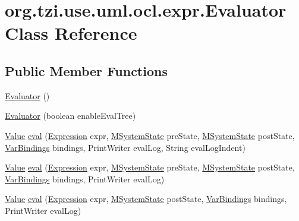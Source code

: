 \hypertarget{classorg_1_1tzi_1_1use_1_1uml_1_1ocl_1_1expr_1_1_evaluator}{\section{org.\-tzi.\-use.\-uml.\-ocl.\-expr.\-Evaluator Class Reference}
\label{classorg_1_1tzi_1_1use_1_1uml_1_1ocl_1_1expr_1_1_evaluator}
}
\subsection*{Public Member Functions}
\begin{DoxyCompactItemize}
\item 
\hyperlink{classorg_1_1tzi_1_1use_1_1uml_1_1ocl_1_1expr_1_1_evaluator_af2a8ee4f6f54ad96f72ef462ae710a34}{Evaluator} ()
\item 
\hyperlink{classorg_1_1tzi_1_1use_1_1uml_1_1ocl_1_1expr_1_1_evaluator_a7c880f37aba37f480e2b3e6488018fda}{Evaluator} (boolean enable\-Eval\-Tree)
\item 
\hyperlink{classorg_1_1tzi_1_1use_1_1uml_1_1ocl_1_1value_1_1_value}{Value} \hyperlink{classorg_1_1tzi_1_1use_1_1uml_1_1ocl_1_1expr_1_1_evaluator_a9070922334fd34fc19083fd06bed56af}{eval} (\hyperlink{classorg_1_1tzi_1_1use_1_1uml_1_1ocl_1_1expr_1_1_expression}{Expression} expr, \hyperlink{classorg_1_1tzi_1_1use_1_1uml_1_1sys_1_1_m_system_state}{M\-System\-State} pre\-State, \hyperlink{classorg_1_1tzi_1_1use_1_1uml_1_1sys_1_1_m_system_state}{M\-System\-State} post\-State, \hyperlink{classorg_1_1tzi_1_1use_1_1uml_1_1ocl_1_1value_1_1_var_bindings}{Var\-Bindings} bindings, Print\-Writer eval\-Log, String eval\-Log\-Indent)
\item 
\hyperlink{classorg_1_1tzi_1_1use_1_1uml_1_1ocl_1_1value_1_1_value}{Value} \hyperlink{classorg_1_1tzi_1_1use_1_1uml_1_1ocl_1_1expr_1_1_evaluator_ad25c717721f5045530433c3c01c97783}{eval} (\hyperlink{classorg_1_1tzi_1_1use_1_1uml_1_1ocl_1_1expr_1_1_expression}{Expression} expr, \hyperlink{classorg_1_1tzi_1_1use_1_1uml_1_1sys_1_1_m_system_state}{M\-System\-State} pre\-State, \hyperlink{classorg_1_1tzi_1_1use_1_1uml_1_1sys_1_1_m_system_state}{M\-System\-State} post\-State, \hyperlink{classorg_1_1tzi_1_1use_1_1uml_1_1ocl_1_1value_1_1_var_bindings}{Var\-Bindings} bindings, Print\-Writer eval\-Log)
\item 
\hyperlink{classorg_1_1tzi_1_1use_1_1uml_1_1ocl_1_1value_1_1_value}{Value} \hyperlink{classorg_1_1tzi_1_1use_1_1uml_1_1ocl_1_1expr_1_1_evaluator_abf44325b4a92a5395e819e95f860ad8c}{eval} (\hyperlink{classorg_1_1tzi_1_1use_1_1uml_1_1ocl_1_1expr_1_1_expression}{Expression} expr, \hyperlink{classorg_1_1tzi_1_1use_1_1uml_1_1sys_1_1_m_system_state}{M\-System\-State} post\-State, \hyperlink{classorg_1_1tzi_1_1use_1_1uml_1_1ocl_1_1value_1_1_var_bindings}{Var\-Bindings} bindings, Print\-Writer eval\-Log)

\end{DoxyCompactItemize}
